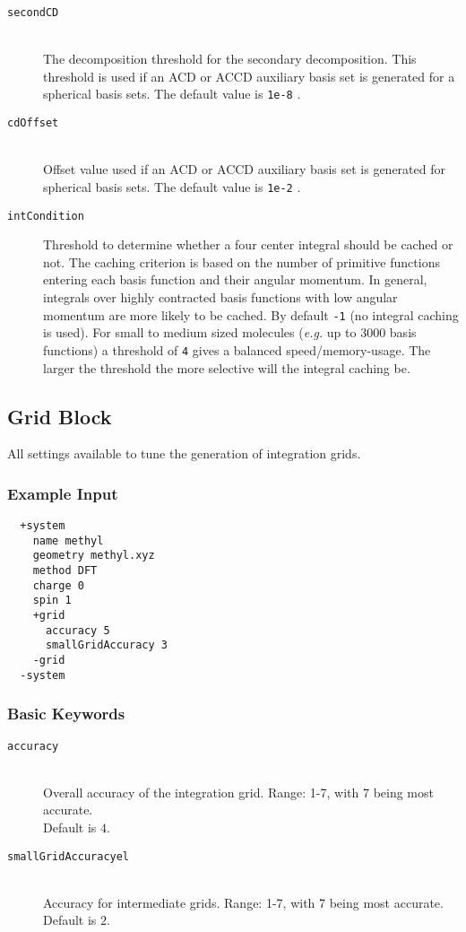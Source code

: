 \documentclass[bibliography=totocnumbered,a4paper,10pt,oneside]{scrbook}
\newcommand{\ttt}[1]{%
  \begingroup\setlength{\fboxsep}{1pt}%
  \colorbox{serenity-green!30}{\texttt{\hspace*{2pt}\vphantom{(g}#1\hspace*{2pt}}}%
  \endgroup
}
\begin{document}
\begin{description}
    \item [\texttt{secondCD}]\hfill\\
    The decomposition threshold for the secondary decomposition. This threshold is used if an ACD or ACCD auxiliary basis set is generated for a spherical basis sets. The default value is \ttt{1e-8}.
    \item [\texttt{cdOffset}]\hfill\\
    Offset value used if an ACD or ACCD auxiliary basis set is generated for spherical basis sets. The default value is \ttt{1e-2}.
    \item[\texttt{intCondition}]
    Threshold to determine whether a four center integral should be cached or not.
    The caching criterion is based on the number of primitive  functions entering each basis function and their angular
    momentum. In general, integrals over highly contracted basis functions with low angular momentum are more likely to
    be cached. By default \ttt{-1} (no integral caching is used). For small to medium sized molecules
    (\emph{e.g.} up to 3000 basis functions) a threshold of \ttt{4} gives a balanced speed/memory-usage. The larger the
    threshold the more selective will the integral caching be.
 \end{description}

\subsection{Grid Block}\label{sec:system:grid}
All settings available to tune the generation of integration grids.
\subsubsection{Example Input}
\begin{lstlisting}
  +system
    name methyl
    geometry methyl.xyz
    method DFT
    charge 0
    spin 1
    +grid
      accuracy 5
      smallGridAccuracy 3
    -grid
  -system
 \end{lstlisting}
\subsubsection{Basic Keywords}
\begin{description}
  \item [\texttt{accuracy}]\hfill \\
  Overall accuracy of the integration grid. Range: 1-7, with 7 being most accurate.\\ Default is $4$.
 \item [\texttt{smallGridAccuracyel}]\hfill \\
 Accuracy for intermediate grids. Range: 1-7, with 7 being most accurate. Default is $2$.
\end{description}
\end{document}
